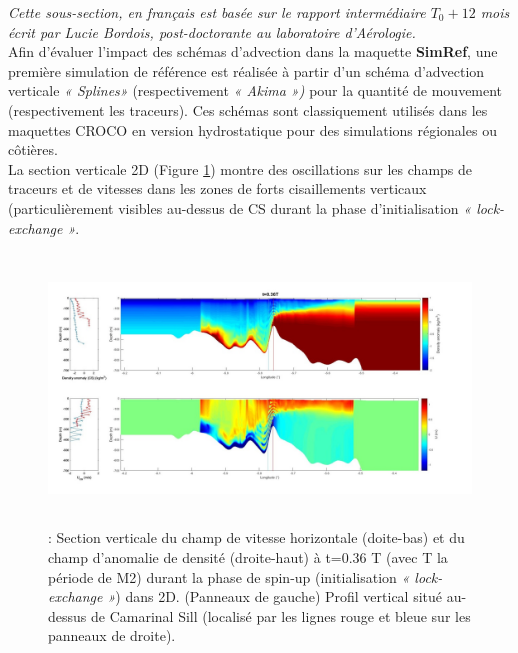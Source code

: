 \noindent \textit{Cette sous-section, en français est basée sur le rapport intermédiaire $T_0 + 12$ mois écrit par Lucie Bordois, post-doctorante au laboratoire d'Aérologie.}\\

Afin d'évaluer l'impact des schémas d'advection dans la maquette \textbf{SimRef}, une première simulation de référence est réalisée à partir d'un schéma d’advection verticale \textit{« Splines»} (respectivement \textit{« Akima »)} pour la quantité de mouvement (respectivement les traceurs). Ces schémas sont classiquement utilisés dans les maquettes CROCO en version hydrostatique pour des simulations régionales ou côtières.\\
La section verticale 2D (Figure \ref{Fig_TVD1}) montre des oscillations sur les champs de traceurs et de vitesses dans les zones de forts cisaillements verticaux (particulièrement visibles au-dessus de CS durant la phase d’initialisation \textit{« lock-exchange »}. 


\begin{figure}[!h]
	\begin{Center}
		\includegraphics[width=5.66in,height=2.83in]{./media/TVD1.jpeg}
		\caption{ : Section verticale du champ de vitesse horizontale (doite-bas) et du champ d’anomalie de densité (droite-haut) à t=0.36 T (avec T la période de M2) durant la phase de spin-up (initialisation \textit{« lock-exchange »}) dans 2D. (Panneaux de gauche) Profil vertical situé au-dessus de Camarinal Sill (localisé par les lignes rouge et bleue sur les panneaux de droite).}
		\label{Fig_TVD1}
	\end{Center}
\end{figure}

